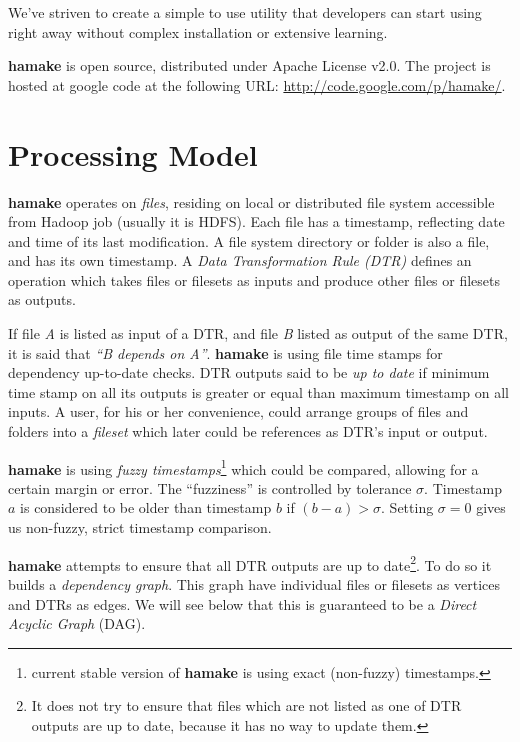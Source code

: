 \documentclass[10pt,conference,letterpaper]{IEEEtran}
\begin{document}
We've striven to create a simple to use utility that developers can
start using right away without complex installation or extensive
learning. 

\textbf{hamake} is open source, distributed under Apache
License v2.0. The project is hosted at google code at the following
URL: \url{http://code.google.com/p/hamake/}.

\section{Processing Model}

\textbf{hamake} operates on \textit{files}, residing on local or
distributed file system accessible from Hadoop job (usually it is
HDFS). Each file has a timestamp, reflecting date and time of its last
modification. A file system directory or folder is also a file, and
has its own timestamp. A \textit{Data Transformation Rule (DTR)}
defines an operation which takes files or filesets as inputs and
produce other files or filesets as outputs.

If file \textit{A} is listed as input of a DTR, and file \textit{B}
listed as output of the same DTR, it is said that \textit{``B depends
  on A''}. \textbf{hamake} is using file time stamps for dependency
up-to-date checks. DTR outputs said to be \textit{up to date} if
minimum time stamp on all its outputs is greater or equal than maximum
timestamp on all inputs. A user, for his or her convenience, could
arrange groups of files and folders into a \emph{fileset} which later
could be references as DTR's input or output.

\textbf{hamake} is using \textit{fuzzy timestamps}\footnote{current stable
  version of \textbf{hamake} is using exact (non-fuzzy) timestamps.}
which could be compared, allowing for a certain margin or error. The
``fuzziness'' is controlled by tolerance $\sigma$. Timestamp $a$ is
considered to be older than timestamp $b$ if $(b-a)>\sigma$. Setting
$\sigma=0$ gives us non-fuzzy, strict timestamp comparison.

\textbf{hamake} attempts to ensure that all DTR outputs are up to
date\footnote{It does not try to ensure that files which are not
  listed as one of DTR outputs are up to date, because it has no way
  to update them.}.  To do so it builds a \textit{dependency
  graph}. This graph have individual files or filesets as vertices and
DTRs as edges. We will see below that this is guaranteed to be a
\textit{Direct Acyclic Graph} (DAG).
\end{document}
